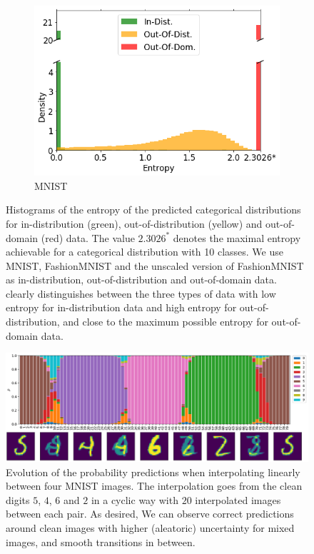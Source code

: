 \begin{figure}[ht]
    \centering
    \begin{subfigure}[t]{.5 \columnwidth}
        \centering
        \includegraphics[width=1 \textwidth]{sections/006_neurips2020/figures/entropy_MNIST.png}
        \caption{MNIST}    
        \end{subfigure}%
    \caption{Histograms of the entropy of the predicted categorical distributions for in-distribution (green), out-of-distribution (yellow) and out-of-domain (red) data. The value $2.3026^*$ denotes the maximal entropy achievable for a categorical distribution with 10 classes. We use MNIST, FashionMNIST and the unscaled version of FashionMNIST as in-distribution, out-of-distribution and out-of-domain data. \oursacro clearly distinguishes between the three types of data with low entropy for in-distribution data and high entropy for out-of-distribution, and close to the maximum possible entropy for out-of-domain data.}
    \label{entropy_MNIST}
\end{figure}

\begin{figure}[ht]
    \centering
        \includegraphics[width=.9 \textwidth]{sections/006_neurips2020/figures/image_interpolation_uncertainty3.pdf}
        
    \caption{Evolution of the probability predictions when interpolating linearly between four MNIST images. The interpolation goes from the clean digits $5$, $4$, $6$ and $2$ in a cyclic way with $20$ interpolated images between each pair. As desired, We can observe correct predictions around clean images with higher (aleatoric) uncertainty for mixed images, and smooth transitions in between.}
    \label{aleatoric_interpolation}
\end{figure}

